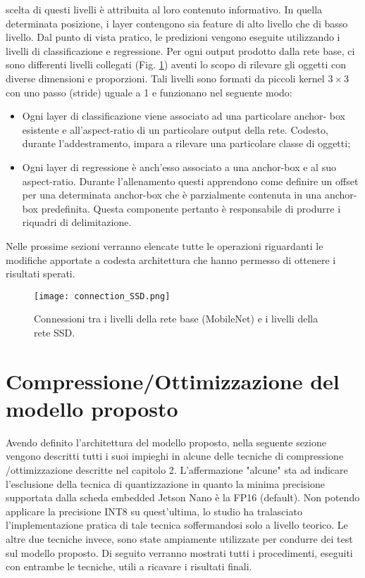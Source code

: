 scelta di questi livelli è attribuita al loro contenuto informativo. In quella 
determinata posizione, i layer contengono sia feature di alto livello che di 
basso livello. Dal punto di vista pratico, le predizioni vengono eseguite 
utilizzando i livelli di classificazione e regressione. Per ogni output prodotto 
dalla rete base, ci sono differenti livelli collegati (Fig. \ref{SSD_conn}) aventi lo scopo 
di rilevare gli oggetti con diverse dimensioni e proporzioni. Tali livelli sono 
formati da piccoli kernel $3\times{3}$ con uno passo (stride) uguale a 1 e funzionano 
nel seguente modo:
\begin{itemize}
    \item Ogni layer di classificazione viene associato ad una particolare anchor-
    box esistente e all'aspect-ratio di un particolare output della rete. 
    Codesto, durante l'addestramento, impara a rilevare una particolare 
    classe di oggetti;
    \item Ogni layer di regressione è anch'esso associato a una anchor-box e 
    al suo aspect-ratio. Durante l'allenamento questi apprendono come 
    definire un offset per una determinata anchor-box che è parzialmente 
    contenuta in una anchor-box predefinita. Questa componente pertanto 
    è responsabile di produrre i riquadri di delimitazione.
\end{itemize}
Nelle prossime sezioni verranno elencate tutte le operazioni riguardanti le 
modifiche apportate a codesta architettura che hanno permesso di ottenere 
i risultati sperati.
\begin{figure}
    \centering
    \texttt{[image: connection\_SSD.png]}
    \centering
    \caption{Connessioni tra i livelli della rete base (MobileNet) e i livelli della rete SSD.}
    \label{SSD_conn}
\end{figure}

\section{Compressione/Ottimizzazione del modello proposto}
Avendo definito l'architettura del modello proposto, nella seguente sezione 
vengono descritti tutti i suoi impieghi in alcune delle tecniche di compressione
/ottimizzazione descritte nel capitolo 2. L'affermazione "alcune" sta 
ad indicare l'esclusione della tecnica di quantizzazione in quanto la minima 
precisione supportata dalla scheda embedded Jetson Nano è la FP16 
(default). Non potendo applicare la precisione INT8 su quest'ultima, lo 
studio ha tralasciato l'implementazione pratica di tale tecnica soffermandosi 
solo a livello teorico. Le altre due tecniche invece, sono state ampiamente 
utilizzate per condurre dei test sul modello proposto. Di seguito verranno 
mostrati tutti i procedimenti, eseguiti con entrambe le tecniche, utili a 
ricavare i risultati finali.

